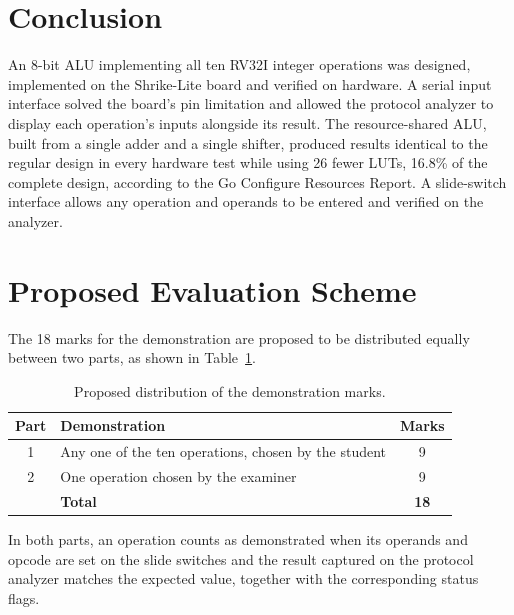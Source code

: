 \documentclass[12pt,a4paper,twoside]{article}
\begin{document}
\section{Conclusion}

An 8-bit ALU implementing all ten RV32I integer operations was designed,
implemented on the Shrike-Lite board and verified on hardware. A serial input
interface solved the board's pin limitation and allowed the protocol analyzer to
display each operation's inputs alongside its result. The resource-shared ALU,
built from a single adder and a single shifter, produced results identical to the
regular design in every hardware test while using 26 fewer LUTs, 16.8\% of the
complete design, according to the Go Configure Resources Report. A slide-switch
interface allows any operation and operands to be entered and verified on the
analyzer.

\section{Proposed Evaluation Scheme}
\label{sec:evaluation}

The 18 marks for the demonstration are proposed to be distributed equally
between two parts, as shown in Table~\ref{tab:evaluation}.

\begin{table}[H]
\centering
\caption{Proposed distribution of the demonstration marks.}
\label{tab:evaluation}
\begin{tabular}{@{}clc@{}}
\toprule
\textbf{Part} & \textbf{Demonstration} & \textbf{Marks} \\
\midrule
1 & Any one of the ten operations, chosen by the student & 9 \\
2 & One operation chosen by the examiner                 & 9 \\
\midrule
  & \textbf{Total}                                       & \textbf{18} \\
\bottomrule
\end{tabular}
\end{table}

\noindent In both parts, an operation counts as demonstrated when its operands
and opcode are set on the slide switches and the result captured on the protocol
analyzer matches the expected value, together with the corresponding status
flags.
\end{document}
